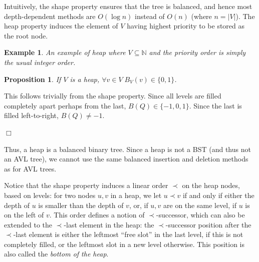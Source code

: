 \documentclass[a4paper]{book}
\theoremstyle{changebreak}                %
\newtheorem{prop}[result]{Proposition}
\newtheorem{eg}[result]{Example}
\newenvironment{proof}
 {{\sl Proof.}\hspace*{1 ex}}%
 {{\nopagebreak\hspace*{\fill}$\Box$\par\vspace{12pt}}}
\begin{document}
Intuitively, the shape property ensures that the tree is
balanced, and hence most
depth-dependent methods are $O(\log n)$
instead of $O(n)$ (where $n=|V|$). The heap property induces the
element of $V$ having highest priority to be
stored as the root node.

\begin{eg}
An example of heap where $V\subseteq\mathbb{N}$ and the priority order
is simply the usual integer order.
\begin{center}
\end{center}
\end{eg}

\begin{prop}
If $V$ is a heap, $\forall v\in V\; B_V(v)\in\{0,1\}$.
\end{prop}
\begin{proof}
This follows trivially from the shape property. Since all levels are filled completely apart
perhaps from the last, $B(Q)\in\{-1,0,1\}$. Since the last is filled
left-to-right, $B(Q)\not=-1$.
\end{proof}
Thus, a heap is a balanced binary
tree. Since a heap is not a BST
(and thus not an AVL tree), we cannot use the same
balanced insertion and deletion methods as for AVL trees.

Notice that the shape property induces a
linear order $\prec$ on the heap
nodes, based on levels: for two nodes $u,v$ in a
heap, we let $u\prec v$ if and only if either the
depth of $u$ is smaller than the depth of $v$, or,
if $u,v$ are on the same level, if $u$ is on the
left of $v$. This order defines a notion of
$\prec$-successor, which can also be extended to the
$\prec$-last element in the heap: the
$\prec$-successor position after the $\prec$-last element is either
the leftmost ``free slot'' in the last level, if this is not
completely filled, or the leftmost slot in a
new level otherwise. This position is also called the {\it bottom of
  the heap}.
\end{document}
